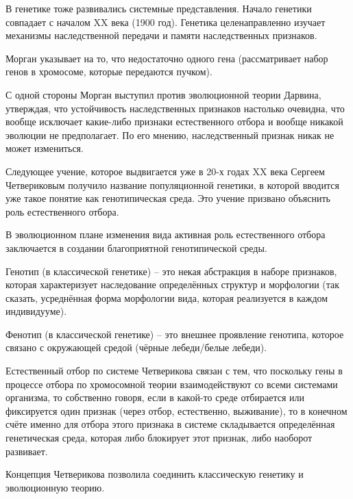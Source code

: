\documentclass[main.tex]{subfiles}
\begin{document}


В генетике тоже развивались системные представления.
Начало генетики совпадает с началом XX века (1900 год).
Генетика целенаправленно изучает механизмы наследственной передачи и памяти наследственных признаков.

Морган указывает на то, что недостаточно одного гена (рассматривает набор генов в хромосоме, которые передаются пучком).

С одной стороны Морган выступил против эволюционной теории Дарвина, утверждая, что устойчивость наследственных признаков настолько очевидна, что вообще исключает какие-либо признаки естественного отбора и вообще никакой эволюции не предполагает.
По его мнению, наследственный признак никак не может измениться.



Следующее учение, которое выдвигается уже в 20-х годах XX века Сергеем Четвериковым получило название популяционной генетики, в которой вводится уже такое понятие как генотипическая среда.
Это учение призвано объяснить роль естественного отбора.

В эволюционном плане изменения вида активная роль естественного отбора заключается в создании благоприятной генотипической среды.

Генотип (в классической генетике) -- это некая абстракция в наборе признаков, которая характеризует наследование определённых структур и морфологии (так сказать, усреднённая форма морфологии вида, которая реализуется в каждом индивидууме).

Фенотип (в классической генетике) -- это внешнее проявление генотипа, которое связано с окружающей средой (чёрные лебеди/белые лебеди).

Естественный отбор по системе Четверикова связан с тем, что поскольку гены в процессе отбора по хромосомной теории взаимодействуют со всеми системами организма, то собственно говоря, если в какой-то среде отбирается или фиксируется один признак (через отбор, естественно, выживание), то в конечном счёте именно для отбора этого признака в системе складывается определённая генетическая среда, которая либо блокирует этот признак, либо наоборот развивает.

Концепция Четверикова позволила соединить классическую генетику и эволюционную теорию.
\end{document}
